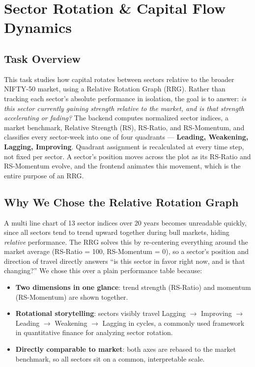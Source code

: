 \documentclass[14pt,a4paper]{extreport}
\begin{document}
\section{Sector Rotation \& Capital Flow Dynamics}

\subsection{Task Overview}
This task studies how capital rotates between sectors relative to the
broader NIFTY-50 market, using a Relative Rotation Graph (RRG). Rather than
tracking each sector's absolute performance in isolation, the goal is to
answer: \textit{is this sector currently gaining strength relative to the
market, and is that strength accelerating or fading?} The backend computes
normalized sector indices, a market benchmark, Relative Strength (RS),
RS-Ratio, and RS-Momentum, and classifies every sector-week into one of
four quadrants --- \textbf{Leading, Weakening, Lagging, Improving}.
Quadrant assignment is recalculated at every time step, not fixed per
sector. A sector's position moves across the plot as its RS-Ratio and
RS-Momentum evolve, and the frontend animates this movement, which is the
entire purpose of an RRG.

\subsection{Why We Chose the Relative Rotation Graph}
A multi line chart of 13 sector indices over 20 years becomes unreadable
quickly, since all sectors tend to trend upward together during bull
markets, hiding \textit{relative} performance. The RRG solves this by
re-centering everything around the market average (RS-Ratio = 100,
RS-Momentum = 0), so a sector's position and direction of travel directly
answers ``is this sector in favor right now, and is that changing?'' We
chose this over a plain performance table because:

\begin{itemize}
    \item \textbf{Two dimensions in one glance}: trend strength (RS-Ratio)
        and momentum (RS-Momentum) are shown together.
    \item \textbf{Rotational storytelling}: sectors visibly travel Lagging
        \(\rightarrow\) Improving \(\rightarrow\) Leading \(\rightarrow\)
        Weakening \(\rightarrow\) Lagging in cycles, a commonly used
        framework in quantitative finance for analyzing sector rotation.
    \item \textbf{Directly comparable to market}: both axes are rebased to
        the market benchmark, so all sectors sit on a common, interpretable
        scale.
\end{itemize}
\end{document}
